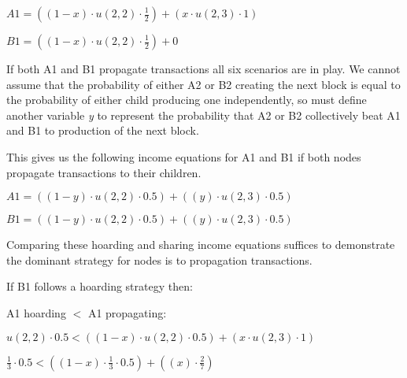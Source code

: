 \documentclass[oneside]{article}   	%
\begin{document}
\begin{multicols}{2}
\normalsize
\begin{adjustwidth}{1.5em}{1.5em} 
	\begin{math}
A1 = \left( (1 - x)\cdot u(2, 2) \cdot \frac{1}{2} \right) + \left( x\cdot u(2,3) \cdot 1 \right)
	\end{math}

	\begin{math}
B1 = \left( (1 - x)\cdot u(2, 2) \cdot \frac{1}{2} \right) + 0
	\end{math}
\end{adjustwidth}
\normalsize

If both A1 and B1 propagate transactions all six scenarios are in play. We cannot assume that the probability of either A2 or B2 creating the next block is equal to the probability of either child producing one independently, so must define another variable \textit{y} to represent the probability that A2 or B2 collectively beat A1 and B1 to production of the next block.

This gives us the following income equations for A1 and B1 if both nodes propagate transactions to their children.

\normalsize
\begin{adjustwidth}{1.5em}{1.5em} 
	\begin{math}
A1 = ((1 - y) \cdot u(2, 2) \cdot 0.5) + ((y) \cdot u(2, 3) \cdot 0.5)
	\end{math}

	\begin{math}
B1 = ((1 - y) \cdot u(2, 2) \cdot 0.5) + ((y) \cdot u(2, 3) \cdot 0.5)
	\end{math}
\end{adjustwidth}
\normalsize

Comparing these hoarding and sharing income equations suffices to demonstrate the dominant strategy for nodes is to propagation transactions. 

If B1 follows a hoarding strategy then:

A1 hoarding \begin{math}<\end{math} A1 propagating:

\normalsize
\begin{adjustwidth}{1.5em}{1.5em} 
	\begin{math}
u(2,2) \cdot 0.5 < ((1 - x) \cdot u(2,2) \cdot 0.5) + (x \cdot u(2,3) \cdot 1)
	\end{math}

	\begin{math}
\frac{1}{3} \cdot 0.5 < ( (1 - x) \cdot \frac{1}{3} \cdot 0.5) + ( (x) \cdot \frac{2}{7} )
	\end{math}


\end{adjustwidth}
\end{multicols}
\end{document}
